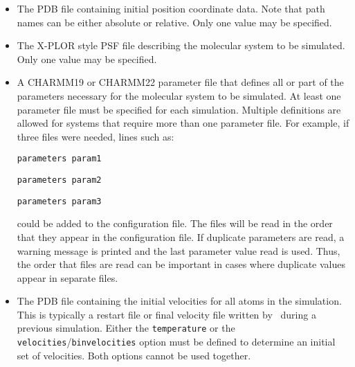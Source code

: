 \begin{itemize}
\item
{}
{\label{param:coordinates}
The PDB file containing initial position coordinate data.  
Note that path names can be either absolute or relative.  
Only one value may be specified.}

\item
{}
{\label{param:structure}
The X-PLOR style PSF file describing the molecular 
system to be simulated.  
Only one value may be specified.}

\item
{}
{\label{param:parameters}
A CHARMM19 or CHARMM22 parameter file that defines all or part 
of the parameters necessary for the molecular system to be simulated.  
At least one parameter file must be specified for each simulation.  
Multiple definitions are allowed for systems that require more 
than one parameter file.  For example, if three files were needed, 
lines such as:

\bigskip

\verb!parameters param1!

\verb!parameters param2!

\verb!parameters param3!

\bigskip

\noindent could be added to the configuration file.  
The files will be read 
in the order that they appear in the configuration file.  If duplicate
parameters are read, a warning message is printed and the last
parameter value read is used.  Thus, the order that files are read 
can be important in cases where duplicate values appear in 
separate files.}

\item
{}
{\label{param:velocities}
The PDB file containing the initial velocities for all 
atoms in the simulation.  
This is typically a restart file or final velocity file written 
by \NAMD\ during a previous simulation.  
Either the \verb!temperature! 
or the \verb!velocities!/\verb!binvelocities! 
option must be defined to determine an initial set of velocities.  
Both options cannot be used together.}


\end{itemize}
